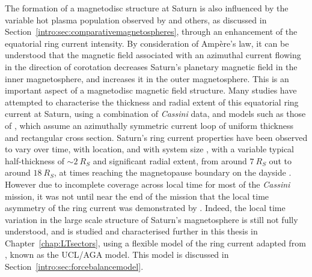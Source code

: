 The formation of a magnetodisc structure at Saturn is also influenced by the variable hot plasma population observed by \citet{sergis2010} and others, as discussed in Section~\ref{intro:sec:comparativemagnetospheres}, through an enhancement of the equatorial ring current intensity. By consideration of Amp\`ere's law, it can be understood that the magnetic field associated with an azimuthal current flowing in the direction of corotation decreases Saturn's planetary magnetic field in the inner magnetosphere, and increases it in the outer magnetosphere. This is an important aspect of a magnetodisc magnetic field structure. Many studies have attempted to characterise the thickness and radial extent of this equatorial ring current at Saturn, using a combination of \textit{Cassini} data, and models such as those of \citet{connerney1981b, connerney1983,bunce2007}, which assume an azimuthally symmetric current loop of uniform thickness and rectangular cross section. Saturn's ring current properties have been observed to vary over time, with location, and with system size \citep[e.g.][]{bunce2007}, with a variable typical half-thickness of ${\sim}\SI{2}{R_S}$ and significant radial extent, from around $\SI{7}{R_S}$ out to around $\SI{18}{R_S}$, at times reaching the magnetopause boundary on the dayside \citep[e.g.][]{kellett2009,sergis2009}. However due to incomplete coverage across local time for most of the \textit{Cassini} mission, it was not until near the end of the mission that the local time asymmetry of the ring current was demonstrated by \citet{sergis2017}. Indeed, the local time variation in the large scale structure of Saturn's magnetosphere is still not fully understood, and is studied and characterised further in this thesis in Chapter~\ref{chap:LTsectors}, using a flexible model of the ring current adapted from \citet{achilleos2010a}, known as the UCL/AGA model. This model is discussed in Section~\ref{intro:sec:forcebalancemodel}.

